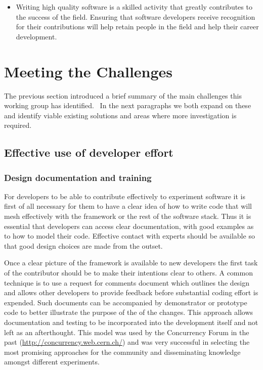 \documentclass[12pt,a4paper]{article}
\begin{document}
\begin{itemize}
\item
    Writing high quality software is a skilled activity that greatly
  contributes to the success of the field. Ensuring that software
  developers receive recognition for their contributions will help
  retain people in the field and help their career development.~
  \end{itemize}

\hypertarget{meeting-the-challenges}{%
\section{Meeting the Challenges}\label{meeting-the-challenges}}

The previous section introduced a brief summary of the main challenges
this working group has identified. ~In the next paragraphs we both
expand on these and identify viable existing solutions and areas where
more investigation is required.~

\hypertarget{effective-use-of-developer-effort}{%
\subsection{Effective use of developer
effort}\label{effective-use-of-developer-effort}}

\subsubsection{Design documentation and training}

For developers to be able to contribute effectively to experiment
software it is first of all necessary for them to have a clear idea of
how to write code that will mesh effectively with the framework or the
rest of the software stack. Thus it is essential that developers can
access clear documentation, with good examples as to how to model their
code. Effective contact with experts should be available so that good
design choices are made from the outset.

Once a clear picture of the framework is available to new developers the
first task of the contributor should be to make their intentions clear
to others. A common technique is to use a request for comments document
which outlines the design and allows other developers to provide
feedback before substantial coding effort is expended. Such documents
can be accompanied by demonstrator or prototype code to better
illustrate the purpose of the of the changes. This approach allows
documentation and testing to be incorporated into the development itself
and not left as an afterthought. This model was used by the Concurrency
Forum in the past
(\href{http://concurrency.web.cern.ch/}{{http://concurrency.web.cern.ch/}})
and was very successful in selecting the most promising approaches for
the community and disseminating knowledge amongst different experiments.
\end{document}
